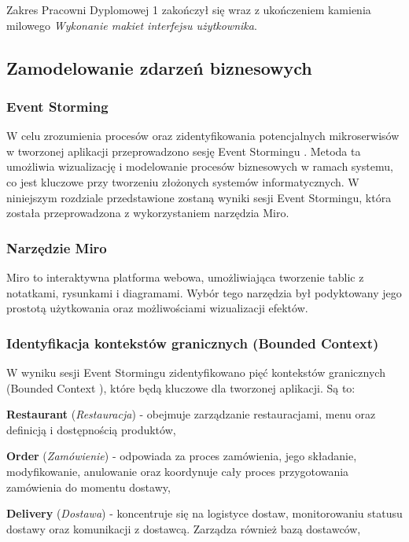 Zakres Pracowni Dyplomowej 1 zakończył się wraz z ukończeniem kamienia milowego \textit{Wykonanie makiet interfejsu użytkownika}.

\subsection{Zamodelowanie zdarzeń biznesowych}

\subsubsection{Event Storming}

W celu zrozumienia procesów oraz zidentyfikowania potencjalnych mikroserwisów w tworzonej aplikacji przeprowadzono sesję Event Stormingu \cite{eventstorming}. Metoda ta umożliwia wizualizację i modelowanie procesów biznesowych w ramach systemu, co jest kluczowe przy tworzeniu złożonych systemów informatycznych. W niniejszym rozdziale przedstawione zostaną wyniki sesji Event Stormingu, która została przeprowadzona z wykorzystaniem narzędzia Miro.

\subsubsection{Narzędzie Miro}

Miro \cite{miro} to interaktywna platforma webowa, umożliwiająca tworzenie tablic z notatkami, rysunkami i diagramami. Wybór tego narzędzia był podyktowany jego prostotą użytkowania oraz możliwościami wizualizacji efektów.

\subsubsection{Identyfikacja kontekstów granicznych (Bounded Context)}

W wyniku sesji Event Stormingu zidentyfikowano pięć kontekstów granicznych (Bounded Context \cite{boundedcontext}), które będą kluczowe dla tworzonej aplikacji. Są to:

\textbf{Restaurant} (\textit{Restauracja}) - obejmuje zarządzanie restauracjami, menu oraz definicją i dostępnością produktów,

\textbf{Order} (\textit{Zamówienie}) - odpowiada za proces zamówienia, jego składanie, modyfikowanie, anulowanie oraz koordynuje cały proces przygotowania zamówienia do momentu dostawy,

\textbf{Delivery} (\textit{Dostawa}) - koncentruje się na logistyce dostaw, monitorowaniu statusu dostawy oraz komunikacji z dostawcą. Zarządza również bazą dostawców,

